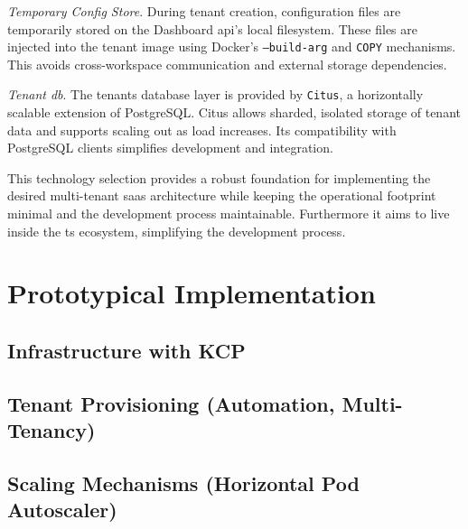 \documentclass[11pt, a4paper, oneside, listof=totoc]{scrartcl}
\begin{document}
\begin{enumerate}[label={[\arabic*]:},
                ref=Challenge~\arabic*,
                leftmargin=*,
                itemsep=0.6\baselineskip]
                \item\label{chal:tempConfigStore}
                    \textit{Temporary Config Store}.
                    During tenant creation, configuration files are temporarily stored on the
                    Dashboard \gls{api}'s local filesystem.
                    These files are injected into the tenant image using Docker's
                    \texttt{--build-arg} and \texttt{COPY} mechanisms.
                    This avoids cross-workspace communication and external storage dependencies.

                \item\label{chal:tenantDB2}
                    \textit{Tenant \gls{db}}.
                    The tenants database layer is provided by \texttt{Citus}, a horizontally
                    scalable extension of PostgreSQL.\@
                    Citus allows sharded, isolated storage of tenant data and supports scaling out
                    as load increases.
                    Its compatibility with PostgreSQL clients simplifies development and
                    integration.

            \end{enumerate}

            This technology selection provides a robust foundation for implementing the desired
            multi-tenant \gls{saas} architecture while keeping the operational footprint minimal and
            the development process maintainable.
            Furthermore it aims to live inside the \gls{ts} ecosystem, simplifying the development
            process.
            \cleardoublepage

    \section{Prototypical Implementation}\label{sec:prototype}

        \subsection{Infrastructure with KCP}\label{subsec:infrastructure}

        \subsection[Tenant Provisioning]{Tenant Provisioning (Automation, Multi-Tenancy)}\label{subsec:tenantProvisioning}

        \subsection[Scaling Mechanisms]{Scaling Mechanisms (Horizontal Pod Autoscaler)}\label{subsec:scaling}
\end{document}
